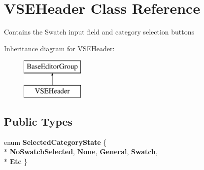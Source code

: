 \hypertarget{class_v_s_e_header}{}\section{V\+S\+E\+Header Class Reference}
\label{class_v_s_e_header}


Contains the Swatch input field and category selection buttons  


Inheritance diagram for V\+S\+E\+Header\+:\begin{figure}[H]
\begin{center}
\leavevmode
\includegraphics[height=2.000000cm]{class_v_s_e_header}
\end{center}
\end{figure}
\subsection*{Public Types}
\begin{DoxyCompactItemize}
\item 
enum {\bfseries Selected\+Category\+State} \{ \\*
{\bfseries No\+Swatch\+Selected}, 
{\bfseries None}, 
{\bfseries General}, 
{\bfseries Swatch}, 
\\*
{\bfseries Etc}
 \}\hypertarget{class_v_s_e_header_a2ed21466f35821439e8d8e2cca94381a}{}\label{class_v_s_e_header_a2ed21466f35821439e8d8e2cca94381a}

\end{DoxyCompactItemize}
